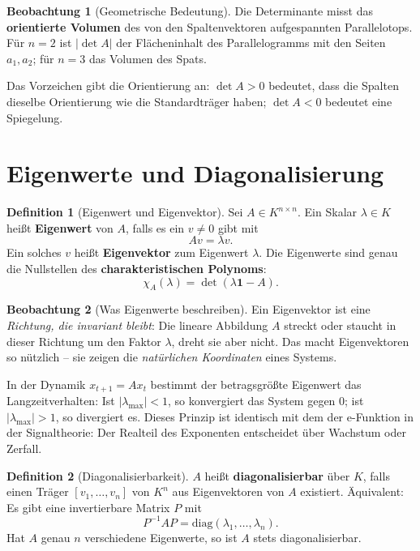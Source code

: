 ﻿\documentclass[a4paper,12pt]{report}
\theoremstyle{definition}
\newtheorem{definition}{Definition}
\newtheorem{beobachtung}{Beobachtung}
\begin{document}
\begin{beobachtung}[Geometrische Bedeutung]
    Die Determinante misst das \textbf{orientierte Volumen} des von den
    Spaltenvektoren aufgespannten Parallelotops. Für $n = 2$ ist $|\det A|$
    der Flächeninhalt des Parallelogramms mit den Seiten $a_1, a_2$;
    für $n = 3$ das Volumen des Spats.

    Das Vorzeichen gibt die Orientierung an: $\det A > 0$ bedeutet, dass
    die Spalten dieselbe Orientierung wie die Standardträger haben;
    $\det A < 0$ bedeutet eine Spiegelung.
\end{beobachtung}

\section{Eigenwerte und Diagonalisierung}

\begin{definition}[Eigenwert und Eigenvektor]
    Sei $A \in K^{n \times n}$. Ein Skalar $\lambda \in K$ heißt
    \textbf{Eigenwert} von $A$, falls es ein $v \neq 0$ gibt mit
    \[
        Av = \lambda v.
    \]
    Ein solches $v$ heißt \textbf{Eigenvektor} zum Eigenwert $\lambda$.
    Die Eigenwerte sind genau die Nullstellen des
    \textbf{charakteristischen Polynoms}:
    \[
        \chi_A(\lambda) = \det(\lambda \mathbf{1} - A).
    \]
\end{definition}

\begin{beobachtung}[Was Eigenwerte beschreiben]
    Ein Eigenvektor ist eine \emph{Richtung, die invariant bleibt}: Die
    lineare Abbildung $A$ streckt oder staucht in dieser Richtung um den
    Faktor $\lambda$, dreht sie aber nicht. Das macht Eigenvektoren so
    nützlich -- sie zeigen die \emph{natürlichen Koordinaten} eines Systems.

    In der Dynamik $x_{t+1} = Ax_t$ bestimmt der betragsgrößte Eigenwert
    das Langzeitverhalten: Ist $|\lambda_{\max}| < 1$, so konvergiert das
    System gegen $0$; ist $|\lambda_{\max}| > 1$, so divergiert es.
    Dieses Prinzip ist identisch mit dem der e-Funktion in der Signaltheorie:
    Der Realteil des Exponenten entscheidet über Wachstum oder Zerfall.
\end{beobachtung}

\begin{definition}[Diagonalisierbarkeit]
    $A$ heißt \textbf{diagonalisierbar} über $K$, falls einen Träger
    $[v_1, \dots, v_n]$ von $K^n$ aus Eigenvektoren von $A$ existiert.
    Äquivalent: Es gibt eine invertierbare Matrix $P$ mit
    \[
        P^{-1} A P = \mathrm{diag}(\lambda_1, \dots, \lambda_n).
    \]
    Hat $A$ genau $n$ verschiedene Eigenwerte, so ist $A$ stets
    diagonalisierbar.
\end{definition}
\end{document}
